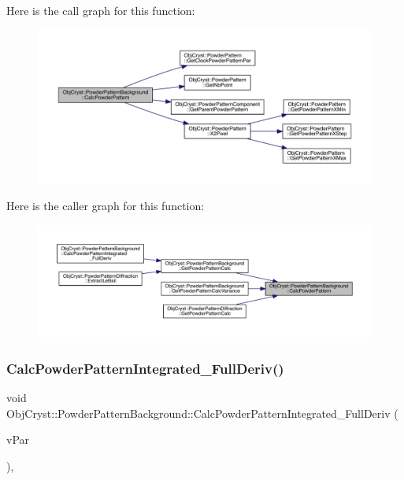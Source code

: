 Here is the call graph for this function\+:
\nopagebreak
\begin{figure}[H]
\begin{center}
\leavevmode
\includegraphics[width=350pt]{class_obj_cryst_1_1_powder_pattern_background_a6e564159536442870bfb17be8e5b51e8_cgraph}
\end{center}
\end{figure}
Here is the caller graph for this function\+:
\nopagebreak
\begin{figure}[H]
\begin{center}
\leavevmode
\includegraphics[width=350pt]{class_obj_cryst_1_1_powder_pattern_background_a6e564159536442870bfb17be8e5b51e8_icgraph}
\end{center}
\end{figure}
\mbox{\label{class_obj_cryst_1_1_powder_pattern_background_a044838d76b1878a029d587480636e80e}} 
\subsubsection{\texorpdfstring{CalcPowderPatternIntegrated\_FullDeriv()}{CalcPowderPatternIntegrated\_FullDeriv()}}
{\footnotesize\ttfamily void Obj\+Cryst\+::\+Powder\+Pattern\+Background\+::\+Calc\+Powder\+Pattern\+Integrated\+\_\+\+Full\+Deriv (\begin{DoxyParamCaption}\item[{std\+::set$<$ Refinable\+Par $\ast$ $>$ \&}]{v\+Par }\end{DoxyParamCaption})\hspace{0.3cm}{\ttfamily [protected]}, {\ttfamily [virtual]}}

